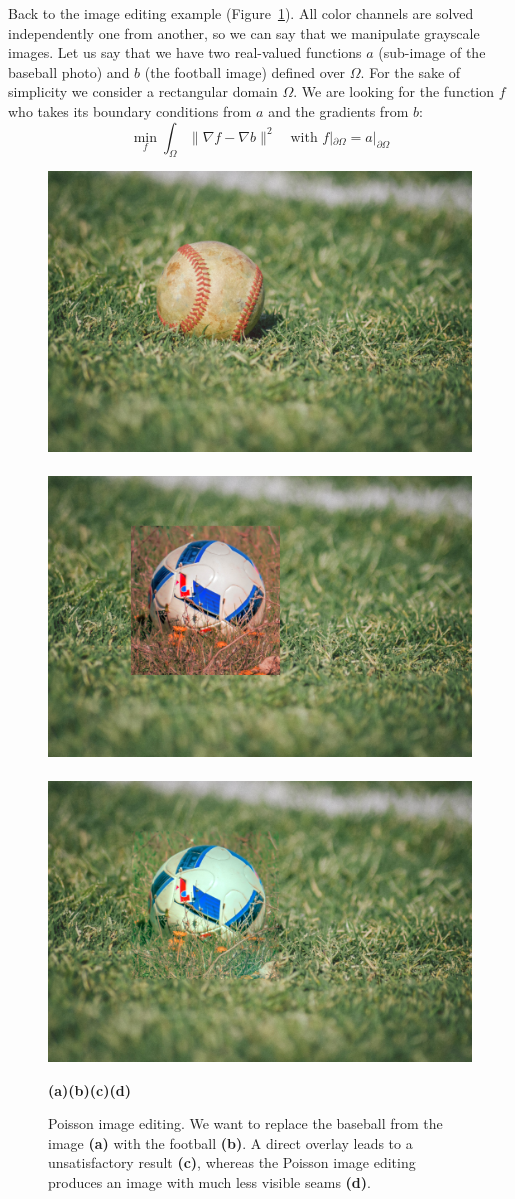\documentclass[notitlepage,oneside]{book}
\begin{document}
Back to the image editing example (Figure~\ref{fig:pie}). All color channels are solved independently one from another, so we can say that we manipulate grayscale images.
Let us say that we have two real-valued functions $a$ (sub-image of the baseball photo) and $b$ (the football image) defined over $\Omega$.
For the sake of simplicity we consider a rectangular domain $\Omega$.
We are looking for the function $f$ who takes its boundary conditions from $a$ and the gradients from $b$:
$$
\min\limits_{f} \int_\Omega \|\nabla f - \nabla b\|^2 \quad \text{with~} f|_{\partial\Omega} = a|_{\partial\Omega}
$$

\begin{figure}[t]
    \centering
    \includegraphics[width=.24\linewidth]{img/pie_baseball.png}~
    ~
    \includegraphics[width=.24\linewidth]{img/pie_overlay.png}~
    \includegraphics[width=.24\linewidth]{img/pie_poisson.png}
    \\
    \begin{flushleft}
    {\hspace{.18\linewidth}\textbf{(a)\hspace{.15\linewidth}(b)\hspace{.14\linewidth}(c)\hspace{.22\linewidth}(d)}}
    \end{flushleft}
    \caption{Poisson image editing. We want to replace the baseball from the image \textbf{(a)} with the football \textbf{(b)}. A direct overlay leads to a unsatisfactory result \textbf{(c)}, whereas the Poisson image editing produces an image with much less visible seams \textbf{(d)}.}
    \label{fig:pie}
\end{figure}
\end{document}
